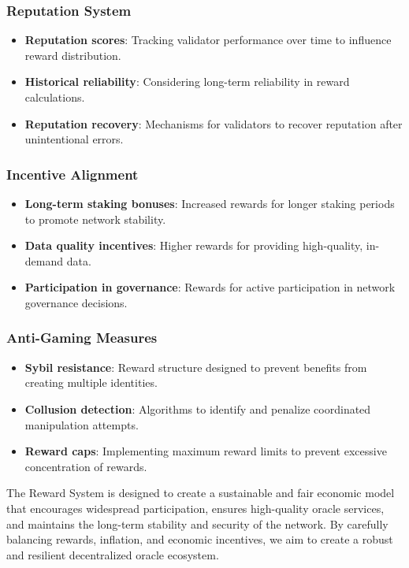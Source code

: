\documentclass[12pt,a4paper]{article}
\begin{document}
	\subsubsection{Reputation System}
	\begin{itemize}
		\item \textbf{Reputation scores}: Tracking validator performance over time to influence reward distribution.
		\item \textbf{Historical reliability}: Considering long-term reliability in reward calculations.
		\item \textbf{Reputation recovery}: Mechanisms for validators to recover reputation after unintentional errors.
	\end{itemize}
	
	\subsubsection{Incentive Alignment}
	\begin{itemize}
		\item \textbf{Long-term staking bonuses}: Increased rewards for longer staking periods to promote network stability.
		\item \textbf{Data quality incentives}: Higher rewards for providing high-quality, in-demand data.
		\item \textbf{Participation in governance}: Rewards for active participation in network governance decisions.
	\end{itemize}
	
	\subsubsection{Anti-Gaming Measures}
	\begin{itemize}
		\item \textbf{Sybil resistance}: Reward structure designed to prevent benefits from creating multiple identities.
		\item \textbf{Collusion detection}: Algorithms to identify and penalize coordinated manipulation attempts.
		\item \textbf{Reward caps}: Implementing maximum reward limits to prevent excessive concentration of rewards.
	\end{itemize}
	
	The Reward System is designed to create a sustainable and fair economic model that encourages widespread participation, ensures high-quality oracle services, and maintains the long-term stability and security of the network. By carefully balancing rewards, inflation, and economic incentives, we aim to create a robust and resilient decentralized oracle ecosystem.
\end{document}
